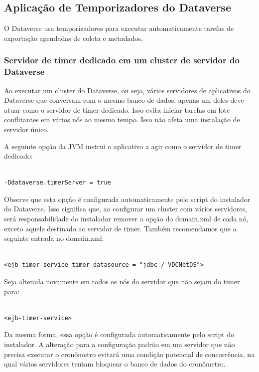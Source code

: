 \documentclass[12pt,hidelinks]{article}
\begin{document}
\subsection{Aplicação de Temporizadores do Dataverse}

\qquad O Dataverse usa temporizadores para executar automaticamente tarefas de exportação agendadas de coleta e metadados.

\subsubsection{Servidor de timer dedicado em um cluster de servidor do Dataverse}

\qquad Ao executar um cluster do Dataverse, ou seja, vários servidores de aplicativos do Dataverse que conversam com o mesmo banco de dados, apenas um deles deve atuar como o servidor de timer dedicado. Isso evita iniciar tarefas em lote conflitantes em vários nós ao mesmo tempo. Isso não afeta uma instalação de servidor único.

A seguinte opção da JVM instrui o aplicativo a agir como o servidor de timer dedicado:

\begin{verbatim}

-Ddataverse.timerServer = true

\end{verbatim}

Observe que esta opção é configurada automaticamente pelo script do instalador do Dataverse. Isso significa que, ao configurar um cluster com vários servidores, será responsabilidade do instalador remover a opção do domain.xml de cada nó, exceto aquele destinado ao servidor de timer. Também recomendamos que a seguinte entrada no domain.xml:

\begin{verbatim}

<ejb-timer-service timer-datasource = "jdbc / VDCNetDS"> 

\end{verbatim}

Seja alterada novamente em todos os nós do servidor que não sejam do timer para: 

\begin{verbatim}

<ejb-timer-service> 

\end{verbatim}

Da mesma forma, essa opção é configurada automaticamente pelo script do instalador. A alteração para a configuração padrão em um servidor que não precisa executar o cronômetro evitará uma condição potencial de concorrência, na qual vários servidores tentam bloquear o banco de dados do cronômetro.
\end{document}
